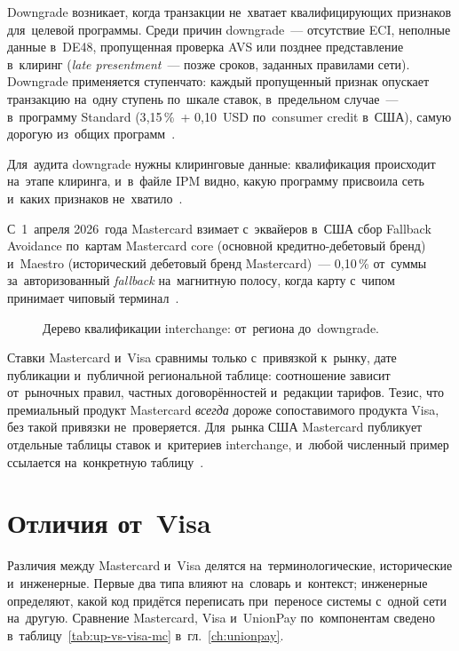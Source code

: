 Downgrade возникает, когда транзакции не~хватает квалифицирующих признаков
для~целевой программы. Среди причин downgrade~--- отсутствие ECI, неполные
данные в~DE48, пропущенная проверка AVS или позднее представление в~клиринг
(\textit{late presentment}~--- позже сроков, заданных правилами сети). Downgrade применяется ступенчато: каждый пропущенный
признак опускает транзакцию на~одну ступень по~шкале ставок, в~предельном
случае~--- в~программу Standard (3{,}15\,\%~+ 0{,}10~USD по~consumer credit
в~США), самую дорогую из~общих программ~\cite{mc-merchant-rates-2025-2026}.

Для~аудита downgrade нужны клиринговые данные: квалификация происходит
на~этапе клиринга, и~в~файле IPM видно, какую программу присвоила сеть
и~каких признаков не~хватило~\cite{mc-interchange-us}.

С~1~апреля 2026~года Mastercard взимает с~эквайеров в~США сбор Fallback
Avoidance по~картам Mastercard core (основной кредитно-дебетовый бренд) и~Maestro (исторический дебетовый бренд Mastercard)~--- 0{,}10\,\% от~суммы за~авторизованный \textit{fallback}
на~магнитную полосу, когда карту с~чипом принимает чиповый терминал~\cite{windriver-mc-fallback-2026,fiserv-card-brand-updates-2026}.

\begin{figure}[tbp]
  \centering
  \caption{Дерево квалификации interchange: от~региона до~downgrade.}\label{fig:interchange-qualification}
\end{figure}

Ставки Mastercard и~Visa сравнимы только с~привязкой к~рынку, дате
публикации и~публичной региональной таблице: соотношение зависит от~рыночных
правил, частных договорённостей и~редакции тарифов. Тезис, что премиальный
продукт Mastercard \emph{всегда} дороже сопоставимого продукта Visa, без такой
привязки не~проверяется. Для~рынка США Mastercard публикует отдельные таблицы
ставок и~критериев interchange, и~любой численный пример ссылается
на~конкретную таблицу~\cite{mc-interchange-us}.

\section{Отличия от~Visa}\label{sec:mc-vs-visa}

Различия между Mastercard и~Visa делятся на~терминологические, исторические
и~инженерные. Первые два типа влияют на~словарь и~контекст; инженерные
определяют, какой код придётся переписать при~переносе системы с~одной сети
на~другую. Сравнение Mastercard, Visa и~UnionPay по~компонентам сведено
в~таблицу~\ref{tab:up-vs-visa-mc} в~гл.~\ref{ch:unionpay}.

